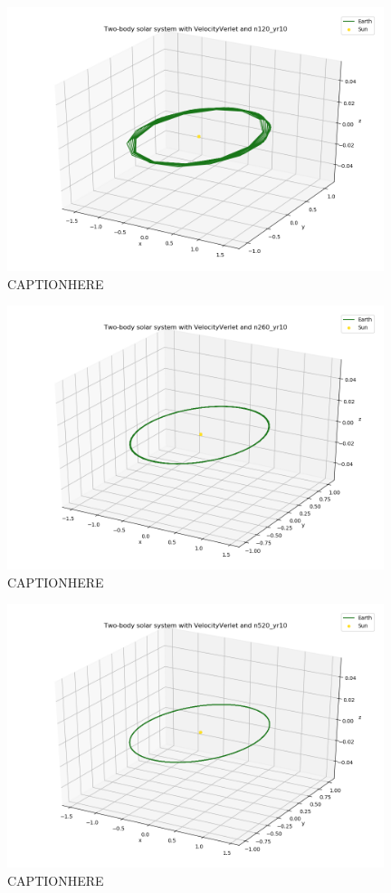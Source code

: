 \documentclass{article}
\begin{document}
    \begin{figure}[H]
        \centering
        \includegraphics[width = 11cm]{img/plot3D_S_E_V_n120_yr10.png}
        \caption{CAPTIONHERE}
        \label{fig:plot3D_S_E_V_n120_yr10}
    \end{figure}

    \begin{figure}[H]
        \centering
        \includegraphics[width = 11cm]{img/plot3D_S_E_V_n260_yr10.png}
        \caption{CAPTIONHERE}
        \label{fig:plot3D_S_E_V_n260_yr10}
    \end{figure}

    \begin{figure}[H]
        \centering
        \includegraphics[width = 11cm]{img/plot3D_S_E_V_n520_yr10.png}
        \caption{CAPTIONHERE}
        \label{fig:plot3D_S_E_V_n520_yr10}
    \end{figure}
\end{document}
